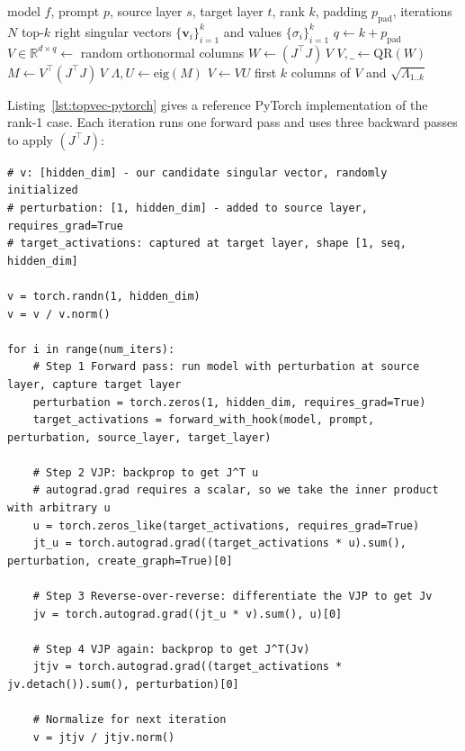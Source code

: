 \documentclass{article}
\begin{document}
\begin{algorithm*}[t]
\caption{Top-$k$ right singular vectors of the layer-to-layer Jacobian.}
\label{alg:block-power-iter}
\begin{algorithmic}[1]
\Require model $f$, prompt $p$, source layer $s$, target layer $t$, rank $k$, padding $p_{\text{pad}}$, iterations $N$
\Ensure top-$k$ right singular vectors $\{\mathbf{v}_i\}_{i=1}^{k}$ and values $\{\sigma_i\}_{i=1}^{k}$
\State $q \gets k + p_{\text{pad}}$
\State $V \in \mathbb{R}^{d \times q} \gets$ random orthonormal columns
    \State $W \gets (J^\top J)\, V$ 
    \State $V, \_ \gets \mathrm{QR}(W)$ 
\EndFor
\State $M \gets V^\top (J^\top J)\, V$ 
\State $\Lambda, U \gets \mathrm{eig}(M)$ 
\State $V \gets V U$
\State \Return first $k$ columns of $V$ and $\sqrt{\Lambda_{1..k}}$
\end{algorithmic}
\end{algorithm*}

Listing~\ref{lst:topvec-pytorch} gives a reference PyTorch implementation of the rank-1 case. Each iteration runs one forward pass and uses three backward passes to apply $(J^\top J)$:

\begin{lstlisting}[caption={Reference PyTorch implementation of rank-1 power iteration on $(J^\top J)$.},label={lst:topvec-pytorch}]
# v: [hidden_dim] - our candidate singular vector, randomly initialized
# perturbation: [1, hidden_dim] - added to source layer, requires_grad=True
# target_activations: captured at target layer, shape [1, seq, hidden_dim]

v = torch.randn(1, hidden_dim)
v = v / v.norm()

for i in range(num_iters):
    # Step 1 Forward pass: run model with perturbation at source layer, capture target layer
    perturbation = torch.zeros(1, hidden_dim, requires_grad=True)
    target_activations = forward_with_hook(model, prompt, perturbation, source_layer, target_layer)

    # Step 2 VJP: backprop to get J^T u
    # autograd.grad requires a scalar, so we take the inner product with arbitrary u
    u = torch.zeros_like(target_activations, requires_grad=True)
    jt_u = torch.autograd.grad((target_activations * u).sum(), perturbation, create_graph=True)[0]

    # Step 3 Reverse-over-reverse: differentiate the VJP to get Jv
    jv = torch.autograd.grad((jt_u * v).sum(), u)[0]

    # Step 4 VJP again: backprop to get J^T(Jv)
    jtjv = torch.autograd.grad((target_activations * jv.detach()).sum(), perturbation)[0]

    # Normalize for next iteration
    v = jtjv / jtjv.norm()
\end{lstlisting}
\end{document}
